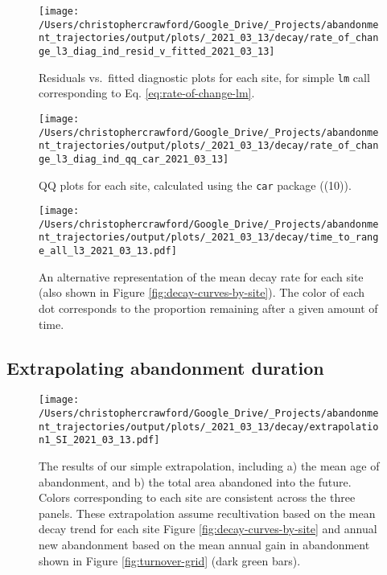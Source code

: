 \documentclass[9pt,twoside,lineno]{pnas-new}
\begin{document}
\begin{figure}
\texttt{[image: /Users/christophercrawford/Google\_Drive/\_Projects/abandonment\_trajectories/output/plots/\_2021\_03\_13/decay/rate\_of\_change\_l3\_diag\_ind\_resid\_v\_fitted\_2021\_03\_13]} \caption{Residuals vs.~fitted diagnostic plots for each site, for simple \texttt{lm} call corresponding to Eq. \eqref{eq:rate-of-change-lm}.}\label{fig:rate-of-change-diag-resid-fitted}
\end{figure}



\begin{figure}
\texttt{[image: /Users/christophercrawford/Google\_Drive/\_Projects/abandonment\_trajectories/output/plots/\_2021\_03\_13/decay/rate\_of\_change\_l3\_diag\_ind\_qq\_car\_2021\_03\_13]} \caption{QQ plots for each site, calculated using the \texttt{car} package ((10)).}\label{fig:rate-of-change-diag-qq}
\end{figure}



\begin{figure}
\centering
\texttt{[image: /Users/christophercrawford/Google\_Drive/\_Projects/abandonment\_trajectories/output/plots/\_2021\_03\_13/decay/time\_to\_range\_all\_l3\_2021\_03\_13.pdf]}
\caption{\label{fig:decay-time-to-range}An alternative representation of the mean decay rate for each site (also shown in Figure \ref{fig:decay-curves-by-site}). The color of each dot corresponds to the proportion remaining after a given amount of time.}
\end{figure}

\newpage

\hypertarget{section-extrapolation-si}{%
\subsection{Extrapolating abandonment duration}\label{section-extrapolation-si}}



\begin{figure}
\centering
\texttt{[image: /Users/christophercrawford/Google\_Drive/\_Projects/abandonment\_trajectories/output/plots/\_2021\_03\_13/decay/extrapolation1\_SI\_2021\_03\_13.pdf]}
\caption{\label{fig:extrapolation-combo}The results of our simple extrapolation, including a) the mean age of abandonment, and b) the total area abandoned into the future. Colors corresponding to each site are consistent across the three panels. These extrapolation assume recultivation based on the mean decay trend for each site Figure \ref{fig:decay-curves-by-site} and annual new abandonment based on the mean annual gain in abandonment shown in Figure \ref{fig:turnover-grid} (dark green bars).}
\end{figure}
\end{document}
